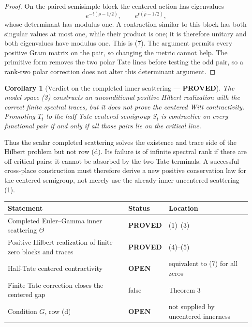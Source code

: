 \documentclass[11pt]{article}
\newcommand{\PROVED}{\textcolor{green!40!black}{\textbf{PROVED}}}
\newcommand{\OPEN}{\textcolor{red!70!black}{\textbf{OPEN}}}
\newtheorem{corollary}{Corollary}
\begin{document}
\begin{proof}
On the paired semisimple block the centered action has eigenvalues
\[
 e^{-t(\rho-1/2)},\qquad e^{t(\overline\rho-1/2)},
\]
whose determinant has modulus one.  A contraction similar to this block
has both singular values at most one, while their product is one; it is
therefore unitary and both eigenvalues have modulus one.  This is (7).
The argument permits every positive Gram matrix on the pair, so changing
the metric cannot help.  The primitive form removes the two polar Tate
lines before testing the odd pair, so a rank-two polar correction does not
alter this determinant argument.
\end{proof}

\begin{corollary}[Verdict on the completed inner scattering --- \PROVED]
The model space (3) constructs an unconditional positive Hilbert
realization with the correct finite spectral traces, but it does not prove
the centered Witt contractivity.  Promoting $T_t$ to the half-Tate centered
semigroup $S_t$ is contractive on every functional pair if and only if all
those pairs lie on the critical line.
\end{corollary}

Thus the scalar completed scattering solves the existence and trace side of
the Hilbert problem but not row (d).  Its failure is of infinite spectral
rank if there are off-critical pairs; it cannot be absorbed by the two Tate
terminals.  A successful cross-place construction must therefore derive a
new positive conservation law for the centered semigroup, not merely use
the already-inner uncentered scattering (1).

\begin{center}
\begin{tabular}{>{\raggedright\arraybackslash}p{.56\linewidth}
                >{\centering\arraybackslash}p{.15\linewidth}
                >{\raggedright\arraybackslash}p{.19\linewidth}}
\toprule
Statement & Status & Location \\
\midrule
Completed Euler--Gamma inner scattering $\Theta$ & \PROVED & (1)--(3) \\
Positive Hilbert realization of finite zero blocks and traces & \PROVED & (4)--(5) \\
Half-Tate centered contractivity & \OPEN & equivalent to (7) for all zeros \\
Finite Tate correction closes the centered gap & false & Theorem 3 \\
Condition $G$, row (d) & \OPEN & not supplied by uncentered innerness \\
\bottomrule
\end{tabular}
\end{center}
\end{document}
